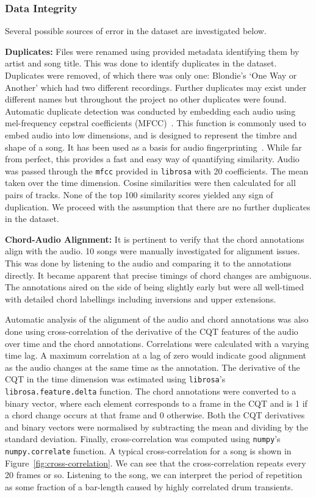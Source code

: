 \subsubsection{Data Integrity}\label{sec:data-integrity}

Several possible sources of error in the dataset are investigated below.

\textbf{Duplicates:} Files were renamed using provided metadata identifying them by artist and song title. This was done to identify duplicates in the dataset. Duplicates were removed, of which there was only one: Blondie's `One Way or Another' which had two different recordings. Further duplicates may exist under different names but throughout the project no other duplicates were found. Automatic duplicate detection was conducted by embedding each audio using mel-frequency cepstral coefficients (MFCC)~\citep{MFCC}. This function is commonly used to embed audio into low dimensions, and is designed to represent the timbre and shape of a song. It has been used as a basis for audio fingerprinting~\citep{MFCCfingerprinting}. While far from perfect, this provides a fast and easy way of quantifying similarity. Audio was passed through the \texttt{mfcc} provided in \texttt{librosa} with 20 coefficients. The mean taken over the time dimension. Cosine similarities were then calculated for all pairs of tracks. None of the top 100 similarity scores yielded any sign of duplication. We proceed with the assumption that there are no further duplicates in the dataset.

\textbf{Chord-Audio Alignment:} It is pertinent to verify that the chord annotations align with the audio. 10 songs were manually investigated for alignment issues. This was done by listening to the audio and comparing it to the annotations directly. It became apparent that precise timings of chord changes are ambiguous. The annotations aired on the side of being slightly early but were all well-timed with detailed chord labellings including inversions and upper extensions.

Automatic analysis of the alignment of the audio and chord annotations was also done using cross-correlation of the derivative of the CQT features of the audio over time and the chord annotations. Correlations were calculated with a varying time lag. A maximum correlation at a lag of zero would indicate good alignment as the audio changes at the same time as the annotation. The derivative of the CQT in the time dimension was estimated using \texttt{librosa}'s \texttt{librosa.feature.delta} function. The chord annotations were converted to a binary vector, where each element corresponds to a frame in the CQT and is 1 if a chord change occurs at that frame and 0 otherwise. Both the CQT derivatives and binary vectors were normalised by subtracting the mean and dividing by the standard deviation. Finally, cross-correlation was computed using \texttt{numpy}'s \texttt{numpy.correlate} function. A typical cross-correlation for a song is shown in Figure~\ref{fig:cross-correlation}. We can see that the cross-correlation repeats every 20 frames or so. Listening to the song, we can interpret the period of repetition as some fraction of a bar-length caused by highly correlated drum transients. 

